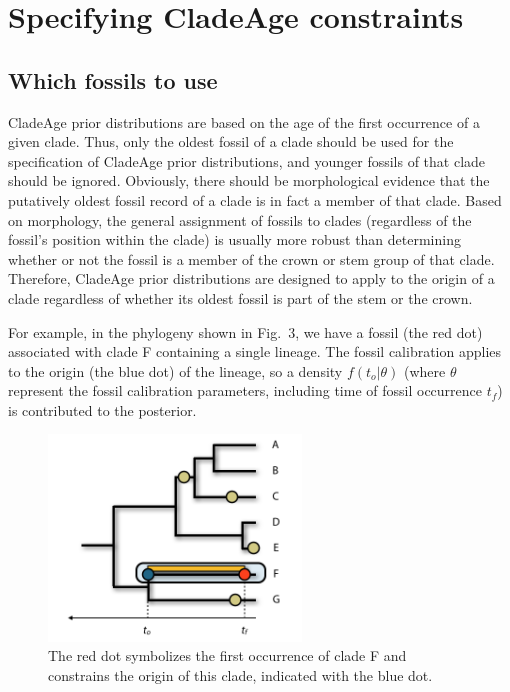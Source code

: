 \documentclass{article}
\begin{document}
\section{Specifying CladeAge constraints}

\subsection{Which fossils to use}
CladeAge prior distributions are based on the age of the first occurrence of a given clade. Thus, only the oldest fossil of a clade should be used for the specification of CladeAge prior distributions, and younger fossils of that clade should be ignored. Obviously,  there should be morphological evidence that the putatively oldest fossil record of a clade is in fact a member of that clade. Based on morphology, the general assignment of fossils to clades (regardless of the fossil's position within the clade) is usually more robust than determining whether or not the fossil is a member of the crown or stem group of that clade. Therefore, CladeAge prior distributions are designed to apply to the origin of a clade regardless of whether its oldest fossil is part of the stem or the crown.

For example, in the phylogeny shown in Fig.\ 3, we have a fossil (the red dot) associated with clade F
containing a single lineage. The fossil calibration applies to the
origin (the blue dot) of the lineage, so a density $f(t_o|\theta)$ (where $\theta$ represent the
fossil calibration parameters, including time of fossil occurrence $t_f$) is contributed 
to the posterior.

\begin{figure}[h!]
\centering
\includegraphics[width=0.6\textwidth]{tree1}
\caption{The red dot symbolizes the first occurrence of clade F and constrains the origin of this clade, indicated with the blue dot.}
\end{figure}
\end{document}
